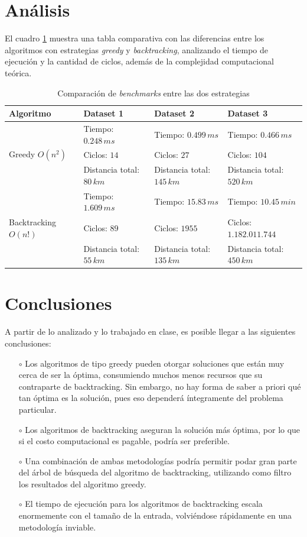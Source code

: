 \documentclass[10 pt, A4paper]{article}
\begin{document}
	\section*{Análisis}
	El cuadro \ref{table} muestra una tabla comparativa con las diferencias entre los algoritmos con estrategias \textit{greedy} y \textit{backtracking}, analizando el tiempo de ejecución y la cantidad de ciclos, además de la complejidad computacional teórica.
	
	\begin{table}[h!]
		\centering
		\begin{tabular}{|p{3.8cm} | p{3.5cm} | p{3.6cm} | p{3.6cm}|}
			\hline
			Algoritmo & Dataset 1 & Dataset 2 & Dataset 3 \\
			\hline
			\multirow{3}{1em}{Greedy $O(n^2)$} & Tiempo: $0.248\,ms$ & Tiempo: $0.499\,ms$& Tiempo: $0.466\,ms$ \\ & Ciclos: $14$ & Ciclos: $27$ & Ciclos: $104$ \\ & Distancia total: $80\,km$ & Distancia total: $145\,km$& Distancia total: $520\,km$ \\
			\hline
			\multirow{3}{1em}{Backtracking $O(n!)$} & Tiempo: $1.609\,ms$& Tiempo: $15.83\,ms$& Tiempo: $10.45\,min$\\ & Ciclos: $89$ & Ciclos: $1955$ & Ciclos: $1.182.011.744$ \\ & Distancia total: $55\,km$& Distancia total: $135\,km$& Distancia total: $450\,km$\\
			\hline
		\end{tabular}
		\caption{Comparación de \textit{benchmarks} entre las dos estrategias}
		\label{table}
	\end{table}
	
	\section*{Conclusiones}
	A partir de lo analizado y lo trabajado en clase, es posible llegar a las siguientes conclusiones:
	\begin{itemize}
		\item[$\circ$] Los algoritmos de tipo greedy pueden otorgar soluciones que están muy cerca de ser la óptima, consumiendo muchos menos recursos que su contraparte de backtracking. Sin embargo, no hay forma de saber a priori qué tan óptima es la solución, pues eso dependerá íntegramente del problema particular.
		\item[$\circ$] Los algoritmos de backtracking aseguran la solución más óptima, por lo que si el costo computacional es pagable, podría ser preferible.
		\item[$\circ$] Una combinación de ambas metodologías podría permitir podar gran parte del árbol de búsqueda del algoritmo de backtracking, utilizando como filtro los resultados del algoritmo greedy.
		\item[$\circ$] El tiempo de ejecución para los algoritmos de backtracking escala enormemente con el tamaño de la entrada, volviéndose rápidamente en una metodología inviable.
	\end{itemize}
	
	
	
%		
	
	
\end{document}
